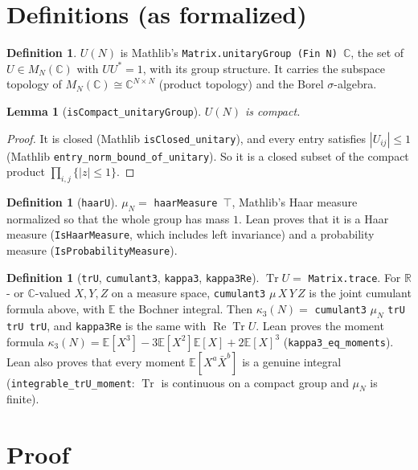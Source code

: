 \documentclass[11pt]{article}
\newtheorem{lemma}[theorem]{Lemma}
\theoremstyle{definition}
\newtheorem{definition}[theorem]{Definition}
\newcommand{\Tr}{\operatorname{Tr}}
\newcommand{\E}{\mathbb{E}}
\begin{document}
\section{Definitions (as formalized)}

\begin{definition}
$U(N)$ is Mathlib's \texttt{Matrix.unitaryGroup (Fin N) $\mathbb{C}$}, the set of
$U\in M_N(\mathbb{C})$ with $U U^* = 1$, with its group structure. It carries the subspace
topology of $M_N(\mathbb{C})\cong\mathbb{C}^{N\times N}$ (product topology) and the Borel
$\sigma$-algebra.
\end{definition}

\begin{lemma}[\texttt{isCompact\_unitaryGroup}]
$U(N)$ is compact.
\end{lemma}
\begin{proof}
It is closed (Mathlib \texttt{isClosed\_unitary}), and every entry satisfies $|U_{ij}|\le 1$
(Mathlib \texttt{entry\_norm\_bound\_of\_unitary}). So it is a closed subset of the compact
product $\prod_{i,j}\{|z|\le1\}$.
\end{proof}

\begin{definition}[\texttt{haarU}]
$\mu_N = $ \texttt{haarMeasure $\top$}, Mathlib's Haar measure normalized so that the whole
group has mass $1$. Lean proves that it is a Haar measure (\texttt{IsHaarMeasure}, which includes
left invariance) and a probability measure (\texttt{IsProbabilityMeasure}).
\end{definition}

\begin{definition}[\texttt{trU}, \texttt{cumulant3}, \texttt{kappa3}, \texttt{kappa3Re}]
$\Tr U = $ \texttt{Matrix.trace}. For $\mathbb{R}$- or $\mathbb{C}$-valued $X,Y,Z$ on a measure
space, \texttt{cumulant3} $\mu\,X\,Y\,Z$ is the joint cumulant formula above, with $\E$ the
Bochner integral. Then $\kappa_3(N)=$ \texttt{cumulant3} $\mu_N$ \texttt{trU trU trU}, and
\texttt{kappa3Re} is the same with $\operatorname{Re}\Tr U$. Lean proves the moment formula
$\kappa_3(N)=\E[X^3]-3\E[X^2]\E[X]+2\E[X]^3$ (\texttt{kappa3\_eq\_moments}). Lean also proves that every
moment $\E[X^a\bar X^b]$ is a genuine integral (\texttt{integrable\_trU\_moment}: $\Tr$ is
continuous on a compact group and $\mu_N$ is finite).
\end{definition}

\section{Proof}
\end{document}
